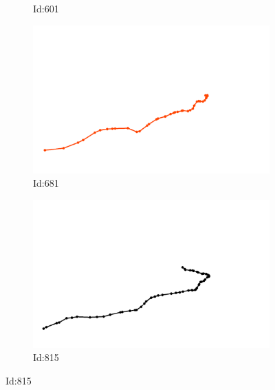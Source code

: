 \documentclass[12pt,twoside]{report}
\begin{document}
\begin{figure}
\begin{subfigure}[b]{0.20\textwidth}
\caption{Id:601}
\end{subfigure}
\begin{subfigure}[b]{0.20\textwidth}
\centering
\includegraphics[width=\textwidth]{../../trajectories/681.png}
\caption{Id:681}
\end{subfigure}
\begin{subfigure}[b]{0.20\textwidth}
\centering
\includegraphics[width=\textwidth]{../../trajectories/815.png}
\caption{Id:815}
\end{subfigure}
\end{figure}
\end{document}
